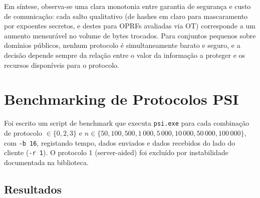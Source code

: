 Em síntese, observa-se uma clara monotonia entre garantia de segurança e custo de comunicação: cada salto qualitativo (de hashes em claro para mascaramento por expoentes secretos, e destes para OPRFs avaliadas via OT) corresponde a um aumento mensurável no volume de bytes trocados. Para conjuntos pequenos sobre domínios públicos, nenhum protocolo é simultaneamente barato e seguro, e a decisão depende sempre da relação entre o valor da informação a proteger e os recursos disponíveis para o protocolo.


\clearpage
\section{Benchmarking de Protocolos PSI}
\label{sec:step3}

Foi escrito um script de benchmark que executa \texttt{psi.exe} para cada combinação de protocolo $\in \{0, 2, 3\}$ e $n \in \{50, 100, 500, 1\,000, 5\,000, 10\,000, 50\,000, 100\,000\}$, com \texttt{-b 16}, registando tempo, dados enviados e dados recebidos do lado do cliente (\texttt{-r 1}). O protocolo 1 (server-aided) foi excluído por instabilidade documentada na biblioteca.

\subsection{Resultados}
\label{sec:bench_results}

